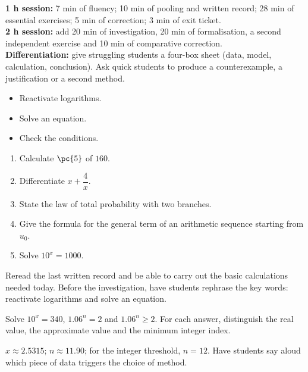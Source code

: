 \ifmxteacher
\begin{method}
\textbf{1 h session:} 7 min of fluency; 10 min of pooling and written record; 28 min of essential exercises; 5 min of correction; 3 min of exit ticket.\\
\textbf{2 h session:} add 20 min of investigation, 20 min of formalisation, a second independent exercise and 10 min of comparative correction.\\
\textbf{Differentiation:} give struggling students a four-box sheet (data, model, calculation, conclusion). Ask quick students to produce a counterexample, a justification or a second method.
\end{method}
\fi
{}
\begin{objectives}\begin{itemize}\item Reactivate logarithms.\item Solve an equation.\item Check the conditions.\end{itemize}\end{objectives}
\begin{fluency}\begin{enumerate}\item Calculate $\pc{5}$ of $160$. \item Differentiate $x+\dfrac4x$. \item State the law of total probability with two branches. \item Give the formula for the general term of an arithmetic sequence starting from $u_0$. \item Solve $10^x=1000$. \end{enumerate}\end{fluency}
\begin{prerequisites}Reread the last written record and be able to carry out the basic calculations needed today. Before the investigation, have students rephrase the key words: reactivate logarithms and solve an equation.\end{prerequisites}

\begin{activity}
Solve $10^x=340$, $\num{1,06}^n=2$ and $\num{1,06}^n\geq2$. For each answer, distinguish the real value, the approximate value and the minimum integer index.

\end{activity}
\begin{solution}$x\approx\num{2,5315}$; $n\approx\num{11,90}$; for the integer threshold, $n=12$. Have students say aloud which piece of data triggers the choice of method.\end{solution}

